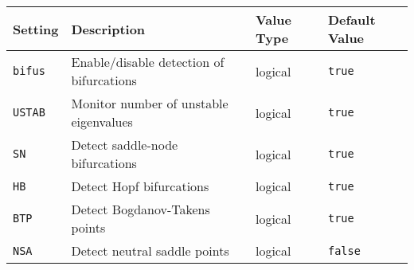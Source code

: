 \documentclass[11pt]{article}
\begin{document}
\begin{table}[h]
  \centering
  \begin{tabular}{l|l|l|l}
    \textbf{Setting} & \textbf{Description}                     & \textbf{Value Type} & \textbf{Default Value} \\[1ex] \hline
    \verb!bifus!     & Enable/disable detection of bifurcations & logical             & \verb!true!            \\[1ex]
    \verb!USTAB!     & Monitor number of unstable  eigenvalues  & logical             & \verb!true!            \\[1ex]
    \verb!SN!        & Detect saddle-node bifurcations          & logical             & \verb!true!            \\[1ex]
    \verb!HB!        & Detect Hopf bifurcations                 & logical             & \verb!true!            \\[1ex]
    \verb!BTP!       & Detect Bogdanov-Takens points            & logical             & \verb!true!            \\[1ex]
    \verb!NSA!       & Detect neutral saddle points             & logical             & \verb!false!           
  \end{tabular}
\end{table}

\end{document}
